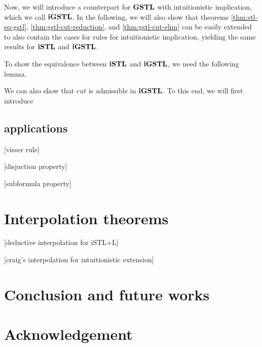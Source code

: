 \documentclass[12pt,a4paper]{article}
\begin{document}
Now, we will introduce a counterpart for $\mathbf{GSTL}$ with intuitionistic implication, which we call $\mathbf{iGSTL}$. In the following, we will also show that theorems \ref{thm:stl-eq-gstl}, \ref{thm:gstl-cut-reduction}, and \ref{thm:gstl-cut-elim} can be easily extended to also contain the cases for rules for intuitionistic implication, yielding the same results for $\mathbf{iSTL}$ and $\mathbf{iGSTL}$.



To show the equivalence between $\mathbf{iSTL}$ and $\mathbf{iGSTL}$, we need the following lemma.





We can also show that $cut$ is admissible in $\mathbf{iGSTL}$. To this end, we will first introduce 



\subsection{applications}
[visser rule]

[disjuction property]

[subformula property]

\section{Interpolation theorems}
[deductive interpolation for iSTL+L]

[craig's interpolation for intuitionistic extension]

\section{Conclusion and future works}

\section{Acknowledgement}



\end{document}
